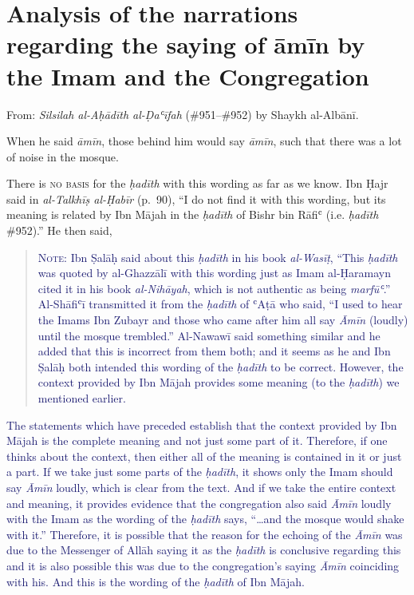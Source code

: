 \hypertarget{analysis-of-the-narrations-regarding-the-saying-of-ux101mux12bn-by-the-imam-and-the-congregation}{%
\chapter{Analysis of the narrations regarding the saying of āmīn by the
Imam and the
Congregation}\label{analysis-of-the-narrations-regarding-the-saying-of-ux101mux12bn-by-the-imam-and-the-congregation}}


From: \emph{Silsilah al-Aḥādīth al-Ḍaʿīfah} (\#951--\#952) by Shaykh
al-Albānī.

\begin{mdframed}[style=narration, frametitle={Narration \#951}]
When he said \textit{āmīn}, those behind him would say \textit{āmīn}, such that there was a lot of noise in the mosque.
\end{mdframed}

There is \textsc{no basis} for the \emph{ḥadīth} with this wording as
far as we know. Ibn Ḥajr said in \emph{al-Talkhīṣ al-Ḥabīr} (p.~90), ``I
do not find it with this wording, but its meaning is related by Ibn
Mājah in the \emph{ḥadīth} of Bishr bin Rāfiʿ (i.e. \textit{ḥadīth} \#952).''
He then said,

\begin{quote}
\textcolor{MidnightBlue}{\textsc{Note}: Ibn Ṣalāḥ said about this \emph{ḥadīth} in his book
\emph{al-Wasīṭ}, ``This \emph{ḥadīth} was quoted by al-Ghazzālī with
this wording just as Imam al-Ḥaramayn cited it in his book
\emph{al-Nihāyah}, which is not authentic as being \emph{marfūʿ}.''
Al-Shāfiʿī transmitted it from the \emph{ḥadīth} of ʿAṭā who said, ``I
used to hear the Imams Ibn Zubayr and those who came after him all say
\emph{Āmīn} (loudly) until the mosque trembled.'' Al-Nawawī said
something similar and he added that this is incorrect from them both;
and it seems as he and Ibn Ṣalāḥ both intended this wording of the
\emph{ḥadīth} to be correct. However, the context provided by Ibn Mājah
provides some meaning (to the \emph{ḥadīth}) we mentioned earlier.}
\end{quote}

\textcolor{MidnightBlue}{The statements which have preceded establish that the context provided
by Ibn Mājah is the complete meaning and not just some part of it.
Therefore, if one thinks about the context, then either all of the
meaning is contained in it or just a part. If we take just some parts of the \emph{ḥadīth}, it shows only the Imam
should say \emph{Āmīn} loudly, which is clear from the text. And if we
take the entire context and meaning, it provides evidence that the
congregation also said \emph{Āmīn} loudly with the Imam as the wording
of the \emph{ḥadīth} says, ``\ldots{}and the mosque would shake with
it.'' Therefore, it is possible that the reason for the echoing of the
\emph{Āmīn} was due to the Messenger of Allāh \pbuh saying it as the
\emph{ḥadīth} is conclusive regarding this and it is also possible this
was due to the congregation's saying \emph{Āmīn} coinciding with his.
And this is the wording of the \emph{ḥadīth} of Ibn Mājah.}

